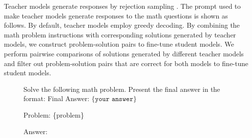 \begin{table}[!h]
\small
\centering
{}
\caption{This table shows the hyper-parameters for LoRA fine-tuning.}
\label{tab: training-lora-hyperparameters}
\end{table}



Teacher models generate responses by rejection sampling \citep{zelikman2022starbootstrappingreasoningreasoning,tong2024dartmathdifficultyawarerejectiontuning,yue2023mammothbuildingmathgeneralist,singh2024humandatascalingselftraining,gulcehre2023reinforcedselftrainingrestlanguage,yuan2023scalingrelationshiplearningmathematical,dong2023raftrewardrankedfinetuning}. The prompt used to make teacher models generate responses to the math questions is shown as follows.
By default, teacher models employ greedy decoding. 
By combining the math problem instructions with corresponding solutions generated by teacher models, we construct problem-solution pairs to fine-tune student models. 
We perform pairwise comparisons of solutions generated by different teacher models and filter out problem-solution pairs that are correct for both models to fine-tune student models.

\begin{figure}[htbp]
    \centering
\begin{tcolorbox}[title=Prompt, promptstyle]
\lstset{
    basicstyle=\normalfont\sffamily\footnotesize,
    breaklines=true,
    frame=none,
    columns=fullflexible,
}
Solve the following math problem. Present the final answer in the format: Final Answer: $\boxed{\{\texttt{your answer}\}}$

Problem: \{problem\}

Answer:
\end{tcolorbox}
    \label{fig: train_sampling_prompt}
\end{figure}





